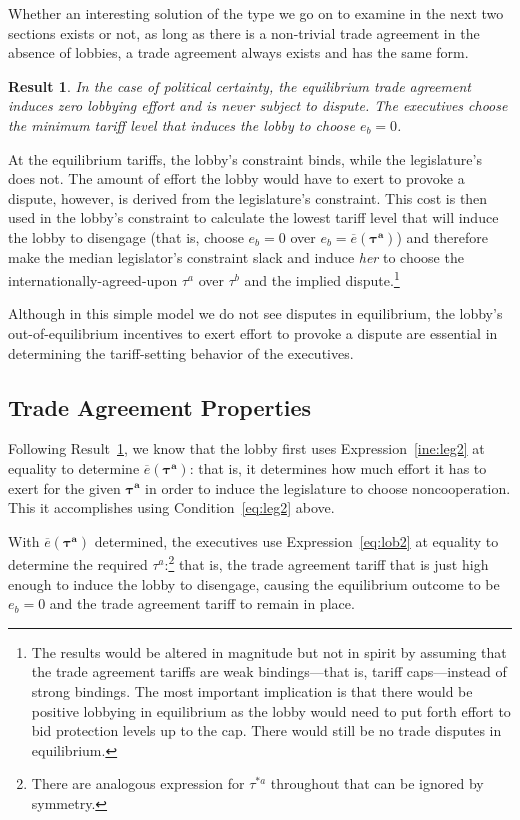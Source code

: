 \documentclass[authoryear, review]{elsarticle}
\newtheorem{result}{Result}
\newcommand{\ov}{\overline}
\newcommand{\bta}{\bm{\tau^a}}
\begin{document}
Whether an interesting solution of the type we go on to examine in the next two sections exists or not, as long as there is a non-trivial trade agreement in the absence of lobbies, a trade agreement always exists and has the same form.				

\begin{result}
  In the case of political certainty, the equilibrium trade agreement induces zero lobbying effort and is never subject to dispute. The executives choose the minimum tariff level that induces the lobby to choose $e_b=0$.
  \label{res:eqm}
\end{result}
At the equilibrium tariffs, the lobby's constraint binds, while the legislature's does not. The amount of effort the lobby would have to exert to provoke a dispute, however, is derived from the legislature's constraint. This cost is then used in the lobby's constraint to calculate the lowest tariff level that will induce the lobby to disengage (that is, choose $e_b =0$ over $e_b=\ov{e}(\bta)$) and therefore make the median legislator's constraint slack and induce \textit{her} to choose the internationally-agreed-upon $\tau^a$ over $\tau^b$ and the implied dispute.\footnote{The results would be altered in magnitude but not in spirit by assuming that the trade agreement tariffs are weak bindings---that is, tariff caps---instead of strong bindings. The most important implication is that there would be positive lobbying in equilibrium as the lobby would need to put forth effort to bid protection levels up to the cap. There would still be no trade disputes in equilibrium.}

Although in this simple model we do not see disputes in equilibrium, the lobby's out-of-equilibrium incentives to exert effort to provoke a dispute are essential in determining the tariff-setting behavior of the executives.

\subsection{Trade Agreement Properties}
Following Result~\ref{res:eqm}, we know that the lobby first uses Expression~\ref{ine:leg2} at equality to determine $\ov{e}(\bta)$: that is, it determines how much effort it has to exert for the given $\bta$ in order to induce the legislature to choose noncooperation. This it accomplishes using Condition~\ref{eq:leg2} above.

With $\ov{e}(\bta)$ determined, the executives use Expression~\ref{eq:lob2} at equality to determine the required $\tau^a$:\footnote{There are analogous expression for $\tau^{*a}$ throughout that can be ignored by symmetry.} that is, the trade agreement tariff that is just high enough to induce the lobby to disengage, causing the equilibrium outcome to be $e_b = 0$ and the trade agreement tariff to remain in place.
\end{document}
